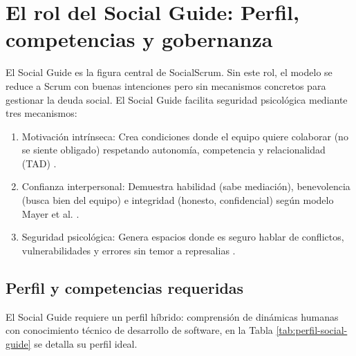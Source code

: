 \section{El rol del Social Guide: Perfil, competencias y gobernanza}
\label{sec:rol-social-guide}

El Social Guide es la figura central de SocialScrum. Sin este rol, el modelo se reduce a Scrum con buenas intenciones pero sin mecanismos concretos para gestionar la deuda social. El Social Guide facilita seguridad psicológica mediante tres mecanismos:

\begin{enumerate}
    \item Motivación intrínseca: Crea condiciones donde el equipo quiere colaborar (no se siente obligado) respetando autonomía, competencia y relacionalidad (TAD) \cite{ryan2000self}.
    \item Confianza interpersonal: Demuestra habilidad (sabe mediación), benevolencia (busca bien del equipo) e integridad (honesto, confidencial) según modelo Mayer et al. \cite{mayer1995integrative}.
    \item Seguridad psicológica: Genera espacios donde es seguro hablar de conflictos, vulnerabilidades y errores sin temor a represalias \cite{edmondson2018fearless}.
\end{enumerate}

\subsection{Perfil y competencias requeridas}

El Social Guide requiere un perfil híbrido: comprensión de dinámicas humanas con conocimiento técnico de desarrollo de software, en la Tabla \ref{tab:perfil-social-guide} se detalla su perfil ideal.

\begingroup
\scriptsize
\renewcommand{\arraystretch}{1.4}

\setlength{\tabcolsep}{4pt}
\setlength{\LTleft}{0pt}
\setlength{\LTright}{0pt}

